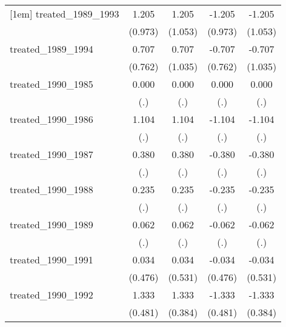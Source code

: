 {\begin{tabular}{l*{4}{c}}
[1em]
treated\_1989\_1993&       1.205         &       1.205         &      -1.205         &      -1.205         \\
            &     (0.973)         &     (1.053)         &     (0.973)         &     (1.053)         \\
[1em]
treated\_1989\_1994&       0.707         &       0.707         &      -0.707         &      -0.707         \\
            &     (0.762)         &     (1.035)         &     (0.762)         &     (1.035)         \\
[1em]
treated\_1990\_1985&       0.000         &       0.000         &       0.000         &       0.000         \\
            &         (.)         &         (.)         &         (.)         &         (.)         \\
[1em]
treated\_1990\_1986&       1.104         &       1.104         &      -1.104         &      -1.104         \\
            &         (.)         &         (.)         &         (.)         &         (.)         \\
[1em]
treated\_1990\_1987&       0.380         &       0.380         &      -0.380         &      -0.380         \\
            &         (.)         &         (.)         &         (.)         &         (.)         \\
[1em]
treated\_1990\_1988&       0.235         &       0.235         &      -0.235         &      -0.235         \\
            &         (.)         &         (.)         &         (.)         &         (.)         \\
[1em]
treated\_1990\_1989&       0.062         &       0.062         &      -0.062         &      -0.062         \\
            &         (.)         &         (.)         &         (.)         &         (.)         \\
[1em]
treated\_1990\_1991&       0.034         &       0.034         &      -0.034         &      -0.034         \\
            &     (0.476)         &     (0.531)         &     (0.476)         &     (0.531)         \\
[1em]
treated\_1990\_1992&       1.333\sym{**} &       1.333\sym{***}&      -1.333\sym{**} &      -1.333\sym{***}\\
            &     (0.481)         &     (0.384)         &     (0.481)         &     (0.384)         \\

\end{tabular}}
